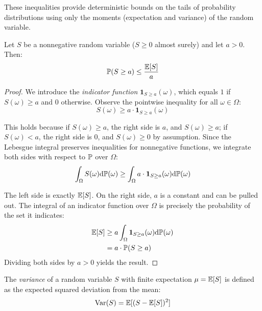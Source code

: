 These inequalities provide deterministic bounds on the tails of probability distributions using only the moments (expectation and variance) of the random variable.

\begin{proposition}
Let $S$ be a nonnegative random variable ($S \geq 0$ almost surely) and let $a > 0$. Then:
\begin{equation}
\Prob(S \geq a) \leq \frac{\E[S]}{a} %
\end{equation}

\end{proposition}

\begin{proof}
We introduce the \textit{indicator function} $\mathbf{1}_{S \geq a}(\omega)$, which equals $1$ if $S(\omega) \geq a$ and $0$ otherwise.
Observe the pointwise inequality for all $\omega \in \Omega$:
\begin{equation}
S(\omega) \geq a \cdot \mathbf{1}_{S \geq a}(\omega)
\end{equation}

This holds because if $S(\omega) \geq a$, the right side is $a$, and $S(\omega) \geq a$; if $S(\omega) < a$, the right side is $0$, and $S(\omega) \geq 0$ by assumption.
Since the Lebesgue integral preserves inequalities for nonnegative functions, we integrate both sides with respect to $\mathbb{P}$ over $\Omega$:
\begin{equation}
\int_\Omega S(\omega) \mathrm{d} \mathbb{P}(\omega) \geq \int_\Omega a \cdot \mathbf{1}_{S \geq a}(\omega) \mathrm{d} \mathbb{P}(\omega)
\end{equation}

The left side is exactly $\operatorname{\mathbb{E}}[S]$. On the right side, $a$ is a constant and can be pulled out. The integral of an indicator function over $\Omega$ is precisely the probability of the set it indicates:
\begin{equation}
\begin{aligned}
\operatorname{\mathbb{E}}[S] &\geq a \int_\Omega \mathbf{1}_{S \geq a}(\omega) \mathrm{d} \mathbb{P}(\omega) \\
&= a \cdot \mathbb{P}(S \geq a)
\end{aligned}
\end{equation}
Dividing both sides by $a > 0$ yields the result.
\end{proof}

\begin{definition}[Variance]
The \textit{variance} of a random variable $S$ with finite expectation $\mu = \operatorname{\mathbb{E}}[S]$ is defined as the expected squared deviation from the mean:
\begin{equation}
\operatorname{Var}(S) = \operatorname{\mathbb{E}}[(S - \operatorname{\mathbb{E}}[S])^2]
\end{equation}

\end{definition}

